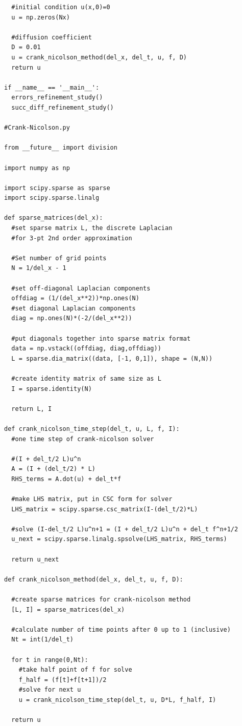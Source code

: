 \documentclass[12pt]{article}
\begin{document}
\begin{verbatim}
  #initial condition u(x,0)=0
  u = np.zeros(Nx)

  #diffusion coefficient
  D = 0.01
  u = crank_nicolson_method(del_x, del_t, u, f, D)
  return u  

if __name__ == '__main__':
  errors_refinement_study()
  succ_diff_refinement_study()

#Crank-Nicolson.py

from __future__ import division

import numpy as np

import scipy.sparse as sparse
import scipy.sparse.linalg

def sparse_matrices(del_x):
  #set sparse matrix L, the discrete Laplacian
  #for 3-pt 2nd order approximation

  #Set number of grid points
  N = 1/del_x - 1

  #set off-diagonal Laplacian components
  offdiag = (1/(del_x**2))*np.ones(N)
  #set diagonal Laplacian components
  diag = np.ones(N)*(-2/(del_x**2))

  #put diagonals together into sparse matrix format
  data = np.vstack((offdiag, diag,offdiag))
  L = sparse.dia_matrix((data, [-1, 0,1]), shape = (N,N))

  #create identity matrix of same size as L
  I = sparse.identity(N)

  return L, I

def crank_nicolson_time_step(del_t, u, L, f, I):
  #one time step of crank-nicolson solver

  #(I + del_t/2 L)u^n
  A = (I + (del_t/2) * L)
  RHS_terms = A.dot(u) + del_t*f

  #make LHS matrix, put in CSC form for solver
  LHS_matrix = scipy.sparse.csc_matrix(I-(del_t/2)*L)

  #solve (I-del_t/2 L)u^n+1 = (I + del_t/2 L)u^n + del_t f^n+1/2
  u_next = scipy.sparse.linalg.spsolve(LHS_matrix, RHS_terms)

  return u_next

def crank_nicolson_method(del_x, del_t, u, f, D):

  #create sparse matrices for crank-nicolson method
  [L, I] = sparse_matrices(del_x)

  #calculate number of time points after 0 up to 1 (inclusive)
  Nt = int(1/del_t)

  for t in range(0,Nt):
    #take half point of f for solve
    f_half = (f[t]+f[t+1])/2
    #solve for next u
    u = crank_nicolson_time_step(del_t, u, D*L, f_half, I)
    
  return u
\end{verbatim}
\end{document}
